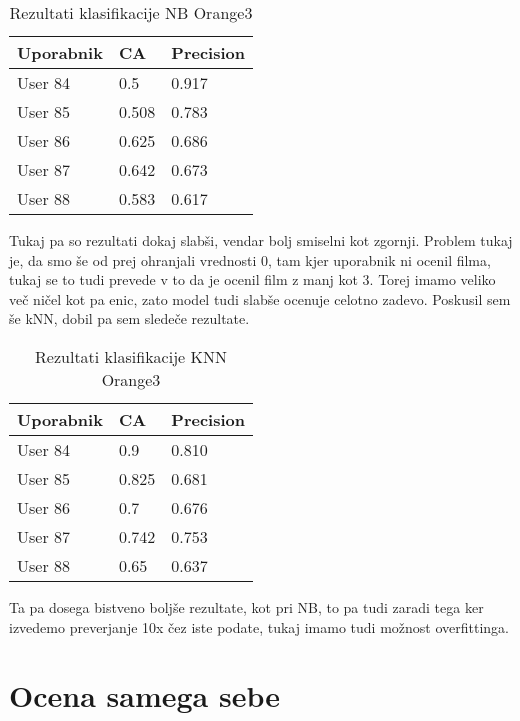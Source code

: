 \documentclass[a4paper,11pt]{article}
\begin{document}
\begin{table}[htbp]
	\caption{Rezultati klasifikacije NB Orange3}
	\label{tab_or_klasnb}
	\begin{center}
		\begin{tabular}{llp{3cm}}
			
			\hline
			Uporabnik & CA & Precision \\
			\hline
			User 84 & 0.5 & 0.917 \\
			User 85 & 0.508 & 0.783 \\
			User 86 & 0.625 & 0.686 \\
			User 87 & 0.642 & 0.673 \\
			User 88 & 0.583 & 0.617 \\
			\hline
		\end{tabular}
	\end{center}
\end{table}

Tukaj pa so rezultati dokaj slabši, vendar bolj smiselni kot zgornji. Problem tukaj je, da smo še od prej ohranjali vrednosti 0, tam kjer uporabnik ni ocenil filma, tukaj se to tudi prevede v to da je ocenil film z manj kot 3. Torej imamo veliko več ničel kot pa enic, zato model tudi slabše ocenuje celotno zadevo. Poskusil sem še kNN, dobil pa sem sledeče rezultate.

\begin{table}[htbp]
	\caption{Rezultati klasifikacije KNN Orange3}
	\label{tab_or_klasknn}
	\begin{center}
		\begin{tabular}{llp{3cm}}
			
			\hline
			Uporabnik & CA & Precision \\
			\hline
			User 84 & 0.9 & 0.810 \\
			User 85 & 0.825 & 0.681 \\
			User 86 & 0.7 & 0.676 \\
			User 87 & 0.742 & 0.753 \\
			User 88 & 0.65 & 0.637 \\
			\hline
		\end{tabular}
	\end{center}
\end{table}

Ta pa dosega bistveno boljše rezultate, kot pri NB, to pa tudi zaradi tega ker izvedemo preverjanje 10x čez iste podate, tukaj imamo tudi možnost overfittinga.

\section{Ocena samega sebe}
\end{document}
